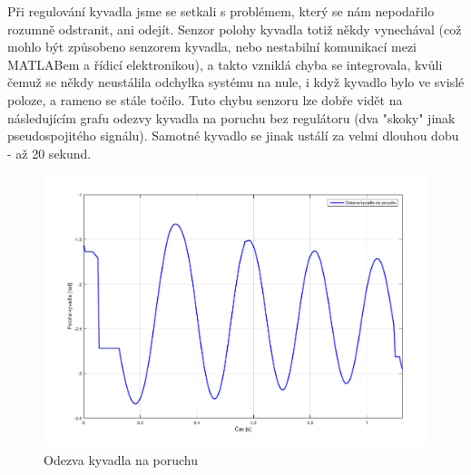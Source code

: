 \documentclass[a4paper,12pt]{article}
\begin{document}
Při regulování kyvadla jsme se setkali s problémem, který se nám nepodařilo rozumně odstranit, ani odejít. Senzor polohy kyvadla totiž někdy vynechával (což mohlo být způsobeno senzorem kyvadla, nebo nestabilní komunikací mezi MATLABem a řídicí elektronikou), a takto vzniklá chyba se integrovala, kvůli čemuž se někdy neustálila odchylka systému na nule, i když kyvadlo bylo ve svislé poloze, a rameno se stále točilo. Tuto chybu senzoru lze dobře vidět na následujícím grafu odezvy kyvadla na poruchu bez regulátoru (dva "skoky" jinak pseudospojitého signálu). Samotné kyvadlo se jinak ustálí za velmi dlouhou dobu - až 20 sekund.
\begin{figure}[H]
	\centering
    \includegraphics[scale=0.45]{odezva_kyvadlo}
    \caption{Odezva kyvadla na poruchu}
\end{figure}
\end{document}
